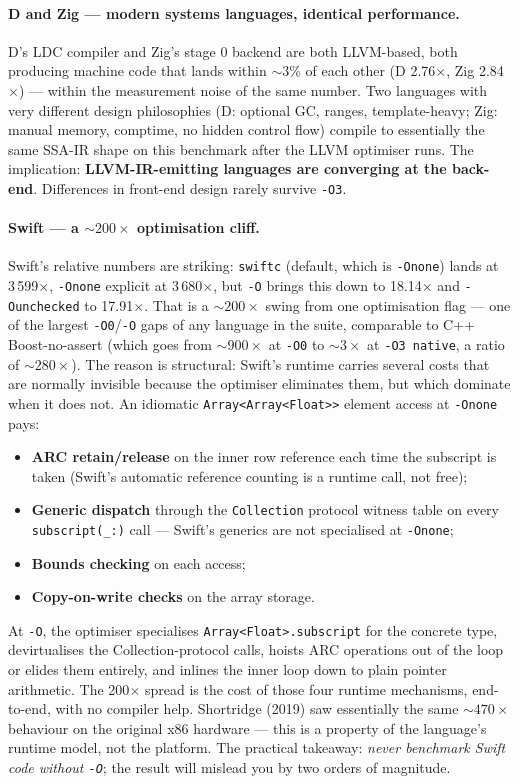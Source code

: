 \documentclass[11pt,a4paper]{article}
\begin{document}
\paragraph{D and Zig --- modern systems languages, identical performance.}
D's LDC compiler and Zig's stage 0 backend are both LLVM-based, both
producing machine code that lands within $\sim$3\% of each other
(D 2.76$\times$, Zig 2.84$\times$) --- within the measurement noise
of the same number. Two languages with
very different design philosophies (D: optional GC, ranges,
template-heavy; Zig: manual memory, comptime, no hidden control
flow) compile to essentially the same SSA-IR shape on this benchmark
after the LLVM optimiser runs. The implication: \textbf{LLVM-IR-emitting
languages are converging at the back-end}. Differences in front-end
design rarely survive \verb|-O3|.

\paragraph{Swift --- a $\sim\!200\!\times$ optimisation cliff.}
Swift's relative numbers are striking: \verb|swiftc| (default, which
is \verb|-Onone|) lands at 3\,599$\times$, \verb|-Onone| explicit at
3\,680$\times$, but \verb|-O| brings this down to 18.14$\times$ and
\verb|-Ounchecked| to 17.91$\times$. That is a $\sim\!200\!\times$
swing from one optimisation flag --- one of the largest
\verb|-O0|/\verb|-O| gaps of any language in the suite, comparable
to C++ Boost-no-assert (which goes from $\sim\!900\!\times$ at
\verb|-O0| to $\sim\!3\!\times$ at \verb|-O3 native|, a ratio of
$\sim\!280\!\times$). The reason is structural:
Swift's runtime carries several costs that are normally invisible
because the optimiser eliminates them, but which dominate when it does
not. An idiomatic \verb|Array<Array<Float>>| element access at
\verb|-Onone| pays:
\begin{itemize}
\item \textbf{ARC retain/release} on the inner row reference each
time the subscript is taken (Swift's automatic reference counting is
a runtime call, not free);
\item \textbf{Generic dispatch} through the \texttt{Collection}
protocol witness table on every \texttt{subscript(\_:)} call ---
Swift's generics are not specialised at \verb|-Onone|;
\item \textbf{Bounds checking} on each access;
\item \textbf{Copy-on-write checks} on the array storage.
\end{itemize}
At \verb|-O|, the optimiser specialises \verb|Array<Float>.subscript|
for the concrete type, devirtualises the Collection-protocol calls,
hoists ARC operations out of the loop or elides them entirely, and
inlines the inner loop down to plain pointer arithmetic. The 200$\times$
spread is the cost of those four runtime mechanisms, end-to-end, with
no compiler help. Shortridge (2019) saw essentially the same
$\sim\!470\!\times$ behaviour on the original x86 hardware --- this
is a property of the language's runtime model, not the platform. The
practical takeaway: \emph{never benchmark Swift code without
\textnormal{\texttt{-O}}}; the result will mislead you by two orders
of magnitude.
\end{document}
